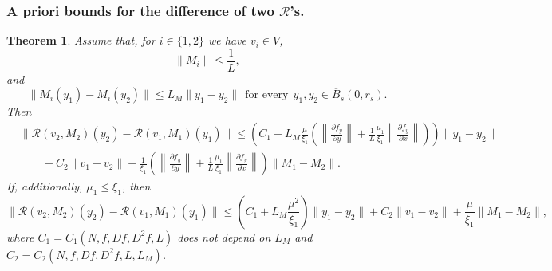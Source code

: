\documentclass[11pt, leqno]{amsart}
\newtheorem{thm}{Theorem}[section]
\theoremstyle{definition}
\begin{document}
\subsubsection{A priori bounds for the difference of two $\mathcal{R}$'s.}
\begin{thm}
	\label{lem:S-M-Lip_2}
	  Assume that, for $i\in \{1,2\}$ we have $v_i \in V$,
	\begin{equation}
		\|M_i\|\leq \frac{1}{L},
	\end{equation} and
	\begin{equation}
		\|M_i(y_1) - M_i(y_2)\| \leq L_M \|y_1 - y_2\|\ \ \textrm{for every}\ \ y_1,y_2\in \overline{B}_s(0,r_s).
	\end{equation}
	Then
	\begin{align*}
& \| \mathcal{R}(v_2,M_2)(y_2) - \mathcal{R}(v_1,M_1)(y_1)\| \leq 	\left(C_1 + L_M \frac{\mu}{\xi_1} \left(\left\|\frac{\partial f_y}{\partial y}\right\|+\frac{1}{L}\frac{\mu_1}{\xi_1}\left\|\frac{\partial f_y}{\partial x}\right\|\right)\right)\|y_1-y_2\| \\
	& \qquad + C_2\|v_1-v_2\| + \frac{1}{\xi_1}\left(\left\|\frac{\partial f_y}{\partial y}\right\|+\frac{1}{L}\frac{\mu_1}{\xi_1}\left\|\frac{\partial f_y}{\partial x}\right\|\right) \|M_1-M_2\|.
	\end{align*}
If, additionally, $\mu_1\leq \xi_1$, then
	\begin{equation}
		\| \mathcal{R}(v_2,M_2)(y_2) - \mathcal{R}(v_1,M_1)(y_1)\|  \leq \left(C_1+ L_M \frac{\mu^2}{\xi_1}\right)\|y_1-y_2\| + C_2\|v_1-v_2\| + \frac{\mu}{\xi_1} \|M_1-M_2\|,
	\end{equation}
	where  $C_1=C_1(N,f,Df,D^2f,L)$ does not depend on $L_M$ and $C_2=C_2(N,f,Df,D^2f,L,L_M)$.
\end{thm}
\end{document}
